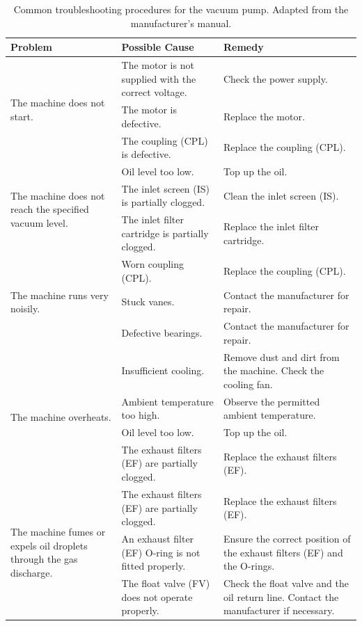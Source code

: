 \begin{table}[htbp]
\centering
\small
\renewcommand{\arraystretch}{1.25}
\caption{Common troubleshooting procedures for the vacuum pump. Adapted from the manufacturer's manual.}
\label{tab:troubleshooting}

\begin{tabularx}{\textwidth}{|p{}|X|X|}
\hline
\textbf{Problem} &
\textbf{Possible Cause} &
\textbf{Remedy} \\
\hline

\multirow{3}{*}{The machine does not start.}
&
The motor is not supplied with the correct voltage.
&
Check the power supply. \\
\cline{2-3}
&
The motor is defective.
&
Replace the motor. \\
\cline{2-3}
&
The coupling (CPL) is defective.
&
Replace the coupling (CPL). \\
\hline

\multirow{3}{*}{%
\parbox{0.26\textwidth}{%
The machine does not reach the specified vacuum level.}}
&
Oil level too low.
&
Top up the oil. \\
\cline{2-3}
&
The inlet screen (IS) is partially clogged.
&
Clean the inlet screen (IS). \\
\cline{2-3}
&
The inlet filter cartridge is partially clogged.
&
Replace the inlet filter cartridge. \\
\hline

\multirow{3}{*}{The machine runs very noisily.}
&
Worn coupling (CPL).
&
Replace the coupling (CPL). \\
\cline{2-3}
&
Stuck vanes.
&
Contact the manufacturer for repair. \\
\cline{2-3}
&
Defective bearings.
&
Contact the manufacturer for repair. \\
\hline

\multirow{4}{*}{The machine overheats.}
&
Insufficient cooling.
&
Remove dust and dirt from the machine.\newline
Check the cooling fan. \\
\cline{2-3}
&
Ambient temperature too high.
&
Observe the permitted ambient temperature. \\
\cline{2-3}
&
Oil level too low.
&
Top up the oil. \\
\cline{2-3}
&
The exhaust filters (EF) are partially clogged.
&
Replace the exhaust filters (EF). \\
\hline

\multirow{3}{*}{%
\parbox{0.26\textwidth}{%
The machine fumes or expels oil droplets through the gas discharge.}}

&
The exhaust filters (EF) are partially clogged.
&
Replace the exhaust filters (EF). \\
\cline{2-3}
&
An exhaust filter (EF) O-ring is not fitted properly.
&
Ensure the correct position of the exhaust filters (EF) and the O-rings. \\
\cline{2-3}
&
The float valve (FV) does not operate properly.
&
Check the float valve and the oil return line. Contact the manufacturer if necessary. \\
\hline

\end{tabularx}
\end{table}


